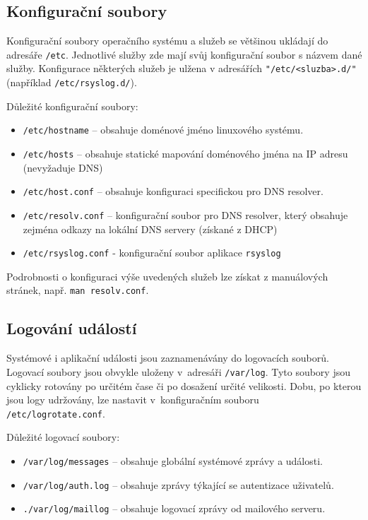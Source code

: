 \subsection{Konfigurační soubory}
Konfigurační soubory operačního systému a služeb se většinou ukládají do adresáře \texttt{/etc}. Jednotlivé služby zde mají svůj konfigurační soubor s názvem dané služby. Konfigurace některých služeb je ulžena v adresářích  \texttt{"/etc/<sluzba>.d/"} (například \texttt{/etc/rsyslog.d/}). 

Důležité  konfigurační soubory:
\begin{itemize}
  \item \texttt{/etc/hostname} -- obsahuje doménové jméno linuxového systému.
  \item \texttt{/etc/hosts} -- obsahuje statické mapování doménového jména na IP adresu (nevyžaduje DNS)
  \item \texttt{/etc/host.conf} -- obsahuje konfiguraci specifickou pro DNS resolver.
  \item \texttt{/etc/resolv.conf} -- konfigurační soubor pro DNS resolver, který obsahuje zejména odkazy na lokální DNS servery (získané z DHCP)
  \item \texttt{/etc/rsyslog.conf} - konfigurační soubor aplikace {\tt rsyslog} 
\end{itemize}
Podrobnosti o konfiguraci výše uvedených služeb lze získat z manuálových stránek, např. {\tt man resolv.conf}. 

\subsection{Logování událostí}
Systémové i aplikační události jsou zaznamenávány do logovacích souborů. Logovací soubory jsou obvykle uloženy v~adresáři \texttt{/var/log}. Tyto soubory jsou cyklicky rotovány po určitém čase či po dosažení určité velikosti. Dobu, po kterou jsou logy udržovány, lze nastavit v~konfiguračním souboru\\\texttt{/etc/logrotate.conf}.

Důležité logovací soubory:
\begin{itemize}
  \item \texttt{/var/log/messages} -- obsahuje globální systémové zprávy a události.
  \item \texttt{/var/log/auth.log} -- obsahuje zprávy týkající se autentizace uživatelů.
  \item {\tt ./var/log/maillog} -- obsahuje logovací zprávy od mailového serveru. 
\end{itemize}

